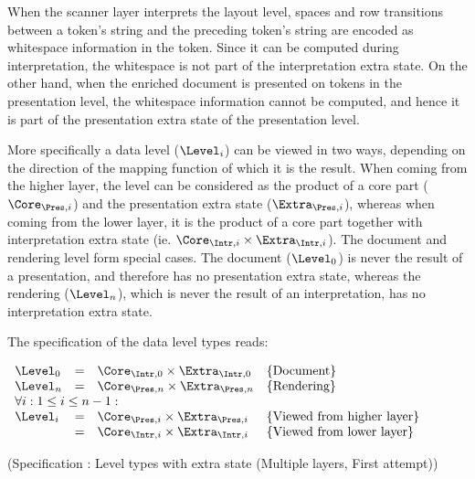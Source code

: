\bc
When the scanner layer interprets the layout level, spaces and row transitions between a token's string and the preceding token's string are encoded as whitespace information in the token. Since it can be computed during interpretation, the whitespace is not part of the interpretation extra state. On the other hand, when the enriched document is presented on tokens in the presentation level, the whitespace information cannot be computed, and hence it is part of the presentation extra state of the presentation level.
\ec


More specifically a data level ($\Level_{i}$) can be viewed in two ways, depending on the direction of the mapping function of which it is the result. When coming from the higher layer, the level can be considered as the product of a core part ($\Core_{\Pres,i}$) and the presentation extra state ($\Extra_{\Pres,i}$), whereas when coming from the lower layer, it is the product of a core part together with interpretation extra state (ie. $\Core_{\Intr,i} \times \Extra_{\Intr,i}$). The document and rendering level form special cases. The document ($\Level_0$) is never the result of a presentation, and therefore has no presentation extra state, whereas the rendering ($\Level_n$), which is never the result of an interpretation, has no interpretation extra state.

The specification of the data level types reads:

\begin{small}
 \label{spec:levelMultiFirst}
\(\begin{array}{lcll}
\Level_{0} & = & \Core_{\Intr,0} \times \Extra_{\Intr,0}      & \text{\{Document\}}\\
\Level_{n} & = & \Core_{\Pres,n} \times \Extra_{\Pres,n}      & \text{\{Rendering\}}\\
\lefteqn{\forall i:1 \le i \le n-1:}  \\
\Level_{i}  & = & \Core_{\Pres,i} \times \Extra_{\Pres,i}     & \text{\{Viewed from higher layer\}}\\
                & = & \Core_{\Intr,i} \times \Extra_{\Intr,i} &  \text{\{Viewed from lower layer\}}\\
\end{array}\)\end{small}
\begin{center}(Specification \thespecification: Level types with extra state (Multiple layers, First attempt))\end{center}\vspace{1em}

